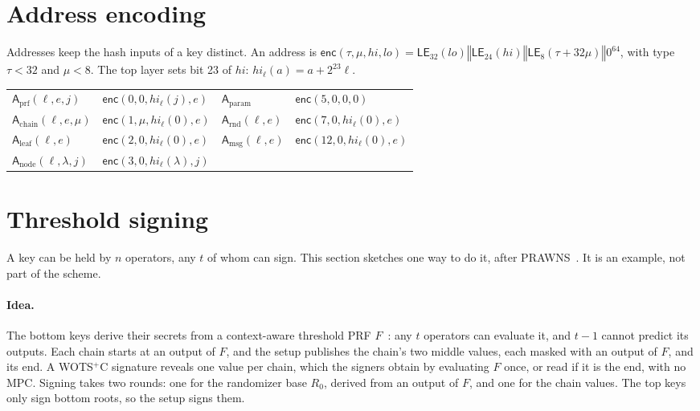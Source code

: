 \documentclass[11pt]{article}
\newcommand{\LE}{\mathsf{LE}}
\newcommand{\concat}{\mathbin\Vert}
\newcommand{\addr}{\mathsf{A}}
\begin{document}
\section{Address encoding}
\label{sec:addresses}

Addresses keep the hash inputs of a key distinct. An address is $\mathsf{enc}(\tau,\mu,\mathit{hi},\mathit{lo})=\LE_{32}(\mathit{lo})\concat\LE_{24}(\mathit{hi})\concat\LE_8(\tau+32\mu)\concat0^{64}$, with type $\tau<32$ and $\mu<8$. The top layer sets bit 23 of $\mathit{hi}$: $\mathit{hi}_\ell(a)=a+2^{23}\ell$.
\begin{center}
\begin{tabular}{@{}ll@{\qquad}ll@{}}
\toprule
$\addr_{\mathrm{prf}}(\ell,e,j)$ & $\mathsf{enc}(0,0,\mathit{hi}_\ell(j),e)$ & $\addr_{\mathrm{param}}$ & $\mathsf{enc}(5,0,0,0)$\\
$\addr_{\mathrm{chain}}(\ell,e,\mu)$ & $\mathsf{enc}(1,\mu,\mathit{hi}_\ell(0),e)$ & $\addr_{\mathrm{rnd}}(\ell,e)$ & $\mathsf{enc}(7,0,\mathit{hi}_\ell(0),e)$\\
$\addr_{\mathrm{leaf}}(\ell,e)$ & $\mathsf{enc}(2,0,\mathit{hi}_\ell(0),e)$ & $\addr_{\mathrm{msg}}(\ell,e)$ & $\mathsf{enc}(12,0,\mathit{hi}_\ell(0),e)$\\
$\addr_{\mathrm{node}}(\ell,\lambda,j)$ & $\mathsf{enc}(3,0,\mathit{hi}_\ell(\lambda),j)$ & & \\
\bottomrule
\end{tabular}
\end{center}

\section{Threshold signing}
\label{sec:threshold}

A key can be held by $n$ operators, any $t$ of whom can sign. This section sketches one way to do it, after PRAWNS~\cite{PRAWNS}. It is an example, not part of the scheme.

\paragraph{Idea.} The bottom keys derive their secrets from a context-aware threshold PRF $F$~\cite{PRAWNS}: any $t$ operators can evaluate it, and $t-1$ cannot predict its outputs. Each chain starts at an output of $F$, and the setup publishes the chain's two middle values, each masked with an output of $F$, and its end. A WOTS$^+$C signature reveals one value per chain, which the signers obtain by evaluating $F$ once, or read if it is the end, with no MPC. Signing takes two rounds: one for the randomizer base $R_0$, derived from an output of $F$, and one for the chain values. The top keys only sign bottom roots, so the setup signs them.
\end{document}
